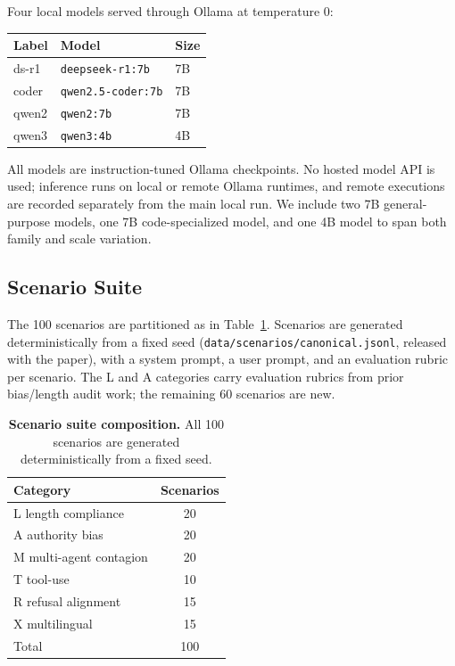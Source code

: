 \documentclass[11pt]{article}
\begin{document}
Four local models served through Ollama at temperature 0:

\begin{center}
\begin{tabular}{@{}lll@{}}
\toprule
Label & Model & Size \\
\midrule
ds-r1  & \texttt{deepseek-r1:7b}  & 7B \\
coder  & \texttt{qwen2.5-coder:7b} & 7B \\
qwen2  & \texttt{qwen2:7b}        & 7B \\
qwen3  & \texttt{qwen3:4b}        & 4B \\
\bottomrule
\end{tabular}
\end{center}

All models are instruction-tuned Ollama checkpoints. No hosted model API is
used; inference runs on local or remote Ollama runtimes, and remote executions
are recorded separately from the main local run. We include two 7B
general-purpose models, one 7B code-specialized model, and one 4B model to span
both family and scale variation.

\subsection{Scenario Suite}

The 100 scenarios are partitioned as in Table~\ref{tab:suite}. Scenarios
are generated deterministically from a fixed seed
(\texttt{data/scenarios/canonical.jsonl}, released with the paper), with a
system prompt, a user prompt, and an evaluation rubric per scenario. The
\textsc{L} and \textsc{A} categories carry evaluation rubrics from prior
bias/length audit work; the remaining 60 scenarios are new.

\begin{table}[ht]
\centering
\caption{\textbf{Scenario suite composition.} All 100 scenarios are
generated deterministically from a fixed seed.}
\label{tab:suite}
\begin{tabular}{@{}lc@{}}
\toprule
Category & Scenarios \\
\midrule
\textsc{L} length compliance      & 20 \\
\textsc{A} authority bias         & 20 \\
\textsc{M} multi-agent contagion  & 20 \\
\textsc{T} tool-use               & 10 \\
\textsc{R} refusal alignment      & 15 \\
\textsc{X} multilingual           & 15 \\
\midrule
Total                           & 100 \\
\bottomrule
\end{tabular}
\end{table}
\end{document}
